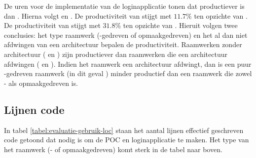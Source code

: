 De uren voor de implementatie van de loginapplicatie tonen dat \jqm{} productiever is dan \lungo{}. 
Hierna volgt \kendo{} en \st{}.
De productiviteit van \lungo{} stijgt met $11.7\%$ ten opzichte van \jqm{}.
De productiviteit van \kendo{} stijgt met $31.8\%$ ten opzichte van \st{}.
Hieruit volgen twee conclusies: het type raamwerk (\js-gedreven of opmaakgedreven) en het al dan niet afdwingen van een architectuur bepalen de productiviteit.
Raamwerken zonder architectuur (\jqm{} en \lungo{}) zijn productiever dan raamwerken die een architectuur afdwingen (\st{} en \kendo{}).
Indien het raamwerk een architectuur afdwingt, dan is een puur \js{}-gedreven raamwerk (in dit geval \st{}) minder productief dan een raamwerk die zowel \js{}- als opmaakgedreven is.

\subsection{Lijnen code}
In tabel \ref{tabel:evaluatie-gebruik-loc} staan het aantal lijnen effectief geschreven code getoond dat nodig is om de POC en loginapplicatie te maken.
Het type van het raamwerk (\js- of opmaakgedreven) komt sterk in de tabel naar boven.

\begin{table}[H]
\centering
{}
\caption{Overzicht van het aantal lijnen effectief geschreven code.}
\label{tabel:evaluatie-gebruik-loc}
\end{table}

